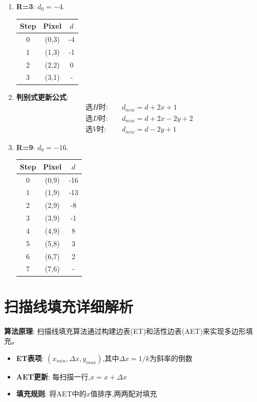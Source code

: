\documentclass[UTF8]{ctexart}
\begin{document}
\begin{enumerate}
    \item \textbf{R=3}: $d_0=-4$.
    \begin{center}
    \begin{tabular}{ccc}
    \toprule Step & Pixel & $d$ \\ \midrule
    0 & (0,3) & -4 \\
    1 & (1,3) & -1 \\
    2 & (2,2) & 0 \\
    3 & (3,1) & - \\ \bottomrule
    \end{tabular}
    \end{center}
    
    \item \textbf{判别式更新公式}:
    \begin{align*}
    \text{选}H\text{时}: & \quad d_{new} = d + 2x + 1 \\
    \text{选}D\text{时}: & \quad d_{new} = d + 2x - 2y + 2 \\
    \text{选}V\text{时}: & \quad d_{new} = d - 2y + 1
    \end{align*}
    
    \item \textbf{R=9}: $d_0=-16$.
    \begin{center}
    \begin{tabular}{ccc}
    \toprule Step & Pixel & $d$ \\ \midrule
    0 & (0,9) & -16 \\
    1 & (1,9) & -13 \\
    2 & (2,9) & -8 \\
    3 & (3,9) & -1 \\
    4 & (4,9) & 8 \\
    5 & (5,8) & 3 \\
    6 & (6,7) & 2 \\
    7 & (7,6) & - \\ \bottomrule
    \end{tabular}
    \end{center}
\end{enumerate}

\section{扫描线填充详细解析}
\textbf{算法原理}: 扫描线填充算法通过构建边表(ET)和活性边表(AET)来实现多边形填充。
\begin{itemize}
    \item \textbf{ET表项}: $(x_{min}, \Delta x, y_{max})$,其中$\Delta x = 1/k$为斜率的倒数
    \item \textbf{AET更新}: 每扫描一行,$x = x + \Delta x$
    \item \textbf{填充规则}: 将AET中的$x$值排序,两两配对填充
\end{itemize}
\end{document}
